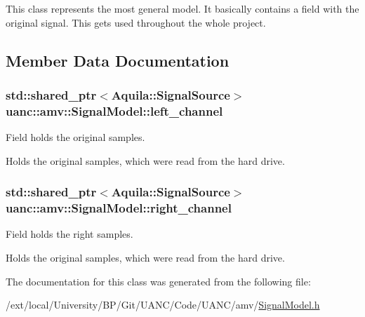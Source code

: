 This class represents the most general model. It basically contains a field with the original signal. This gets used throughout the whole project. 

\subsection{Member Data Documentation}
\subsubsection[{\texorpdfstring{left\+\_\+channel}{left_channel}}]{\setlength{\rightskip}{0pt plus 5cm}std\+::shared\+\_\+ptr$<$Aquila\+::\+Signal\+Source$>$ uanc\+::amv\+::\+Signal\+Model\+::left\+\_\+channel}\hypertarget{classuanc_1_1amv_1_1_signal_model_a608802e04d8ce5d49c730d568f0c3fd7}{}\label{classuanc_1_1amv_1_1_signal_model_a608802e04d8ce5d49c730d568f0c3fd7}


Field holds the original samples. 

Holds the original samples, which were read from the hard drive. 
\subsubsection[{\texorpdfstring{right\+\_\+channel}{right_channel}}]{\setlength{\rightskip}{0pt plus 5cm}std\+::shared\+\_\+ptr$<$Aquila\+::\+Signal\+Source$>$ uanc\+::amv\+::\+Signal\+Model\+::right\+\_\+channel}\hypertarget{classuanc_1_1amv_1_1_signal_model_a97081cc1295d40bc9410e883bcc02a84}{}\label{classuanc_1_1amv_1_1_signal_model_a97081cc1295d40bc9410e883bcc02a84}


Field holds the right samples. 

Holds the original samples, which were read from the hard drive. 

The documentation for this class was generated from the following file\+:\begin{DoxyCompactItemize}
\item 
/ext/local/\+University/\+B\+P/\+Git/\+U\+A\+N\+C/\+Code/\+U\+A\+N\+C/amv/\hyperlink{_signal_model_8h}{Signal\+Model.\+h}\end{DoxyCompactItemize}
